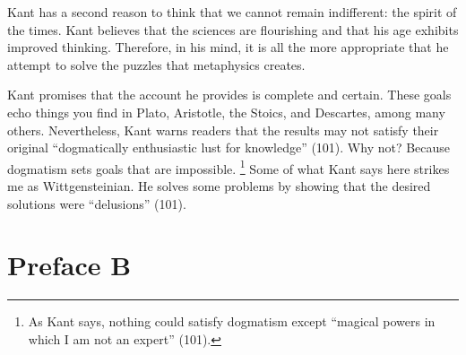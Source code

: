 \documentclass[12pt,letterpaper]{article}
\begin{document}
Kant has a second reason to think that we cannot remain indifferent: the spirit of the times.
Kant believes that the sciences are flourishing and that his age exhibits improved thinking.
Therefore, in his mind, it is all the more appropriate that he attempt to solve the puzzles that metaphysics creates.

Kant promises that the account he provides is complete and certain.
These goals echo things you find in Plato, Aristotle, the Stoics, and Descartes, among many others.
Nevertheless, Kant warns readers that the results may not satisfy their original ``dogmatically enthusiastic lust for knowledge'' (101).
Why not? 
Because dogmatism sets goals that are impossible.%
\footnote{As Kant says, nothing could satisfy dogmatism except ``magical powers in which I am not an expert'' (101).}
Some of what Kant says here strikes me as Wittgensteinian.
He solves some problems by showing that the desired solutions were ``delusions'' (101).

\section*{Preface B}



\newpage
\pagestyle{references}

\printbibliography[filter=primary,title={Primary Sources}]
\printbibliography[filter=secondary,title={Secondary Sources}]
\end{document}
